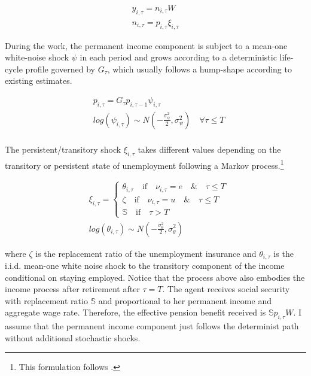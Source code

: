 \begin{equation}
\begin{split}
y_{i,\tau} = n_{i,\tau}W \\ 
n_{i,\tau} = p_{i,\tau}\xi_{i,\tau}
\end{split}
\end{equation}

During the work, the permanent income component is subject to a mean-one white-noise shock $\psi$ in each period and grows according to a deterministic life-cycle profile governed by $G_\tau$, which usually follows a hump-shape according to existing estimates. \citep{gourinchas2002consumption}

\begin{equation}
\begin{split}
& p_{i,\tau} = G_\tau p_{i,\tau-1}\psi_{i,\tau} \\
& log (\psi_{i,\tau}) \sim N(-\frac{\sigma^2_{\psi}}{2},\sigma^2_{\psi}) \quad \forall \tau \leq T \\
\end{split}
\end{equation}

The persistent/transitory shock $\xi_{i,\tau}$ takes different values depending on the transitory or persistent state of unemployment following a Markov process.\footnote{This formulation follows \cite{krueger2016macroeconomics}.}  

\begin{equation}
\begin{split}
& \xi_{i,\tau} =   \left\{
\begin{array}{ll}
 \theta_{i,\tau} \quad \text{if} \quad \nu_{i,\tau} =e \quad \& \quad  \tau \leq T \\
      \zeta \quad \text{if} \quad \nu_{i,\tau} = u \quad \& \quad \tau \leq T  \\
      \mathbb{S} \quad \text{if}  \quad \tau > T
\end{array} \right. \\
& log(\theta_{i,\tau}) \sim N(-\frac{\sigma^2_\theta}{2},\sigma^2_\theta)
\end{split}
\end{equation}

where $\zeta$ is the replacement ratio of the unemployment insurance and $\theta_{i,\tau}$ is the i.i.d. mean-one white noise shock to the transitory component of the income conditional on staying employed. Notice that the process above also embodies the income process after retirement after $\tau=T$. The agent receives social security with replacement ratio $\mathbb{S}$ and proportional to her permanent income and aggregate wage rate. Therefore, the effective pension benefit received is $\mathbb{S}p_{i,\tau}W$. I assume that the permanent income component just follows the determinist path without additional stochastic shocks. 

